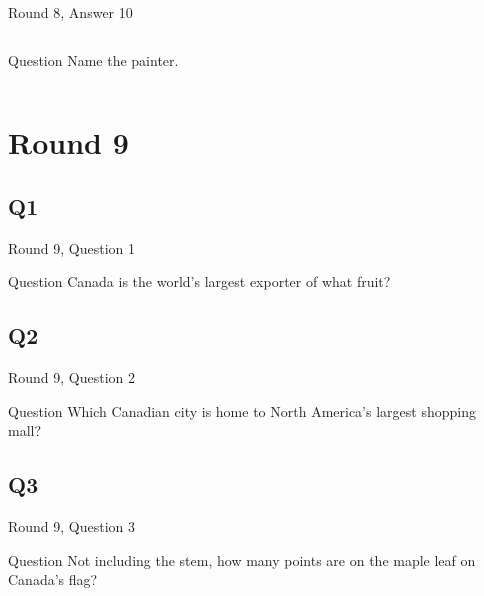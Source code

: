 \documentclass[11pt]{beamer}
\begin{document}
\begin{frame}[t]{Round 8, Answer 10}
\vspace{0.5em}
\begin{columns}[T,totalwidth=\linewidth]
\begin{column}{0.35\linewidth}
\begin{block}{Question}
Name the painter.
\end{block}
\end{column}
\begin{column}{0.6\linewidth}
\begin{center}
\texttt{[image: \{Images/rothko]}.jpg}
\end{center}
\end{column}
\end{columns}
\end{frame}
    

\def\thisSectionName{Canada --- Our Friendly Neighbor to the North}
\section{Round 9}
    

\subsection*{Q1}
\begin{frame}[t]{Round 9, Question 1}
\vspace{0.5em}
\begin{block}{Question}
Canada is the world's largest exporter of what fruit?
\end{block}
\end{frame}
    

\subsection*{Q2}
\begin{frame}[t]{Round 9, Question 2}
\vspace{0.5em}
\begin{block}{Question}
Which Canadian city is home to North America's largest shopping mall?
\end{block}
\end{frame}
    

\subsection*{Q3}
\begin{frame}[t]{Round 9, Question 3}
\vspace{0.5em}
\begin{block}{Question}
Not including the stem, how many points are on the maple leaf on Canada's flag?
\end{block}
\end{frame}
    
\end{document}
